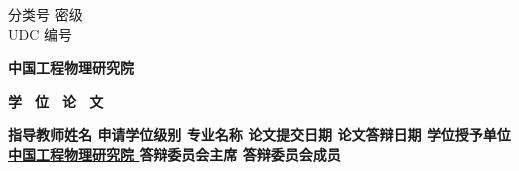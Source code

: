 \pagestyle{empty}
\noindent
分类号
\fixedunderline[4cm]{\theclsnum}
\hfill
密级
\fixedunderline[4cm]{\theconflv} \\
\noindent
UDC \hspace{0.5em}
\fixedunderline[4cm]{\theUDC}
\hfill
编号
\fixedunderline[4cm]{\thethesisnum}

\begin{center}
  \vspace{10pt}
  \bfseries 中国工程物理研究院
  \vspace{0.5em}
\end{center}
\begin{center}
  \bfseries
  学 \, 位 \, 论 \, 文
\end{center}

\begin{center}
  \vspace{10pt}
  \underline{\bfseries \thecntitle}
\end{center}

\begin{center}
  \vspace{20pt}
  \bfseries
  \underline{\thecnauthor}
\end{center}

\vspace{20pt}

{ \noindent
  \bfseries
  \vspace{20pt}
  指导教师姓名 \uline{
    \hfill \thesupervisorcn
    \quad
    \supervisortitlecn
    \hfill
  }
  \newline
  \vspace{20pt}
  申请学位级别 \uline{
    \hfill \thedgreelevelcn
    \hfill
  }
  专业名称 \uline{
    \hfill \thefieldcn
    \hfill
  }
  \newline
  \vspace{20pt}
  论文提交日期 \uline{
    \hfill \thesubmitdate
    \hfill
  }
  论文答辩日期 \uline{
    \hfill \thedefencedate
    \hfill
  }
  \newline
  \vspace{20pt}
  学位授予单位 \uline{
    \hfill 中国工程物理研究院
    \hfill
  }
  \newline
  \vspace{20pt}
  答辩委员会主席 \uline{
    \hfill \thechairman \hfill
  }
  \newline
  \vspace{20pt}
  答辩委员会成员 \uline{
    \hfill \thereviewer \hfill
}
}

